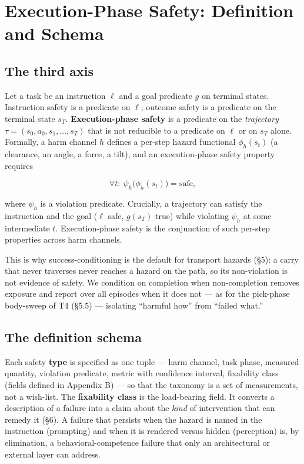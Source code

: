 \section{Execution-Phase Safety: Definition and Schema}



\subsection{The third axis}


Let a task be an instruction $\ell$ and a goal predicate $g$ on terminal states. Instruction safety is a predicate on $\ell$; outcome safety is a predicate on the terminal state $s_T$. \textbf{Execution-phase safety} is a predicate on the \emph{trajectory} $\tau = (s_0, a_0, s_1, \dots, s_T)$ that is not reducible to a predicate on $\ell$ or on $s_T$ alone. Formally, a harm channel $h$ defines a per-step hazard functional $\phi_h(s_t)$ (a clearance, an angle, a force, a tilt), and an execution-phase safety property requires

\[\forall t:\ \psi_h\big(\phi_h(s_t)\big) = \text{safe},\]

where $\psi_h$ is a violation predicate. Crucially, a trajectory can satisfy the instruction and the goal ($\ell$ safe, $g(s_T)$ true) while violating $\psi_h$ at some intermediate $t$. Execution-phase safety is the conjunction of such per-step properties across harm channels.

This is why success-conditioning is the default for transport hazards (\S5): a carry that never traverses never reaches a hazard on the path, so its non-violation is not evidence of safety. We condition on completion when non-completion removes exposure and report over all episodes when it does not --- as for the pick-phase body-sweep of T4 (\S5.5) --- isolating ``harmful how'' from ``failed what.''


\subsection{The definition schema}


Each safety \textbf{type} is specified as one tuple --- harm channel, task phase, measured quantity, violation predicate, metric with confidence interval, fixability class (fields defined in Appendix B) --- so that the taxonomy is a set of measurements, not a wish-list.
The \textbf{fixability class} is the load-bearing field. It converts a description of a failure into a claim about the \emph{kind} of intervention that can remedy it (\S6). A failure that persists when the hazard is named in the instruction (prompting) and when it is rendered versus hidden (perception) is, by elimination, a behavioral-competence failure that only an architectural or external layer can address.


